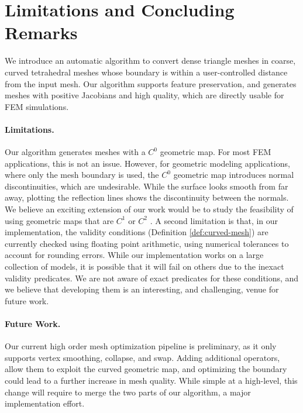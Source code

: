 \section{Limitations and Concluding Remarks}\label{cumin:sec:conclusion}

We introduce an automatic algorithm to convert dense triangle meshes in coarse, curved tetrahedral meshes whose boundary is within a user-controlled distance from the input mesh. Our algorithm supports feature preservation, and generates meshes with positive Jacobians and high quality, which are directly usable for FEM simulations. 

\paragraph{Limitations.} Our algorithm generates meshes with a $C^0$ geometric map. For most FEM applications, this is not an issue. However, for geometric modeling applications, where only the mesh boundary is used, the $C^0$ geometric map introduces normal discontinuities, which are undesirable.
While the surface looks smooth from  far away, plotting the reflection lines shows the discontinuity between the normals. We believe an exciting extension of our work would be to study the feasibility of using geometric maps that are $C^1$ \cite{lyche2015simplex} or $C^2$ \cite{Xia:2017:IGA}. A second limitation is that, in our implementation, the validity conditions (Definition \ref{def:curved-mesh}) are currently checked using floating point arithmetic, using numerical tolerances to account for rounding errors. While our implementation works on a large collection of models, it is possible that it will fail on others due to the inexact validity predicates. We are not aware of exact predicates for these conditions, and we believe that developing them is an interesting, and challenging, venue for future work.

\paragraph{Future Work.} Our current high order mesh optimization pipeline is preliminary, as it only supports vertex smoothing, collapse, and swap. Adding additional operators, allow them to exploit the curved geometric map, and optimizing the boundary could lead to a further increase in mesh quality. While simple at a high-level, this change will require to merge the two parts of our algorithm, a major implementation effort.

